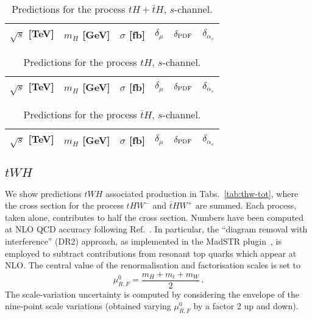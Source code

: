 \documentclass[a4paper,usenames,dvipsnames,11pt]{article}
\begin{document}
\begin{table}
    \centering
    \begin{tabular}{cccccc}
        $\sqrt{s}$ [TeV]  &  $m_H$ [GeV]  &  $\sigma$ [fb]  & $\delta_{\mu}$   &  $\delta_{\rm PDF}$   & $\delta_{\alpha_s}$\\
        \hline
    \end{tabular}
    \caption{\label{tab:th-s-tot} Predictions for the process $tH + \bar t H$, $s$-channel.}
\end{table}
%
\begin{table}
    \centering
    \begin{tabular}{cccccc}
        $\sqrt{s}$ [TeV]  &  $m_H$ [GeV]  &  $\sigma$ [fb]  & $\delta_{\mu}$   &  $\delta_{\rm PDF}$   & $\delta_{\alpha_s}$\\
        \hline
    \end{tabular}
    \caption{\label{tab:th-s-top} Predictions for the process $tH$, $s$-channel.}
\end{table}
%
\begin{table}
    \centering
    \begin{tabular}{cccccc}
        $\sqrt{s}$ [TeV]  &  $m_H$ [GeV]  &  $\sigma$ [fb]  & $\delta_{\mu}$   &  $\delta_{\rm PDF}$   & $\delta_{\alpha_s}$\\
        \hline
    \end{tabular}
    \caption{\label{tab:th-s-atop} Predictions for the process $\bar tH$, $s$-channel.}
\end{table}

\subsection{$tWH$}
We show predictions $tWH$ associated production in Tabs.~\ref{tab:thw-tot}, where the cross section for the process $tHW^-$ and $\bar t HW^+$ are summed. Each
process, taken alone, contributes to half the cross section. Numbers have been computed at NLO QCD accuracy following Ref.~\cite{Demartin:2016axk}. In particular, the ``diagram removal with interference'' (DR2)
approach, as implemented in the {\sc MadSTR} plugin~\cite{Frixione:2019fxg}, is employed to subtract contributions from resonant top quarks which appear at NLO.
The central value of the renormalisation and factorisation scales is set to
\begin{equation}
    \mu_{R,F}^0 = \frac{m_H+m_t+m_W}{2}\,.
\end{equation}
The scale-variation uncertainty is computed by considering the envelope of the 
nine-point scale variations (obtained varying $ \mu_{R,F}^0$ by a factor 2 up and down).
\end{document}
